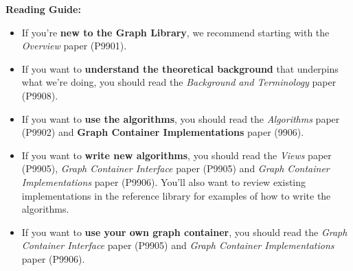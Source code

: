 \textbf{Reading Guide:} 
\begin{itemize}
  \item If you're \textbf{new to the Graph Library}, we recommend starting with the \textit{Overview} paper (P9901).
  \item If you want to \textbf{understand the theoretical background} that underpins what we're doing, you should read the \textit{Background and Terminology} paper (P9908).
  \item If you want to \textbf{use the algorithms}, you should read the \textit{Algorithms} paper (P9902) and \textbf{Graph Container Implementations} paper (9906).
  \item If you want to \textbf{write new algorithms}, you should read the \textit{Views} paper (P9905), \textit{Graph Container Interface} paper (P9905) and \textit{Graph Container Implementations} paper (P9906).
        You'll also want to review existing implementations in the reference library for examples of how to write the algorithms.
  \item If you want to \textbf{use your own graph container}, you should read the \textit{Graph Container Interface} paper (P9905) and \textit{Graph Container Implementations} paper (P9906).
\end{itemize}

  
%
